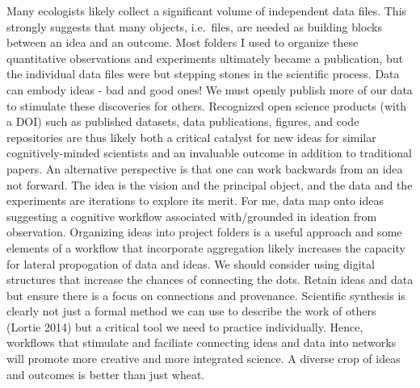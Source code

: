 \documentclass[]{elsarticle} %
\begin{document}
Many ecologists likely collect a significant volume of independent data
files. This strongly suggests that many objects, i.e.~files, are needed
as building blocks between an idea and an outcome. Most folders I used
to organize these quantitative observations and experiments ultimately
became a publication, but the individual data files were but stepping
stones in the scientific process. Data can embody ideas - bad and good
ones! We must openly publish more of our data to stimulate these
discoveries for others. Recognized open science products (with a DOI)
such as published datasets, data publications, figures, and code
repositories are thus likely both a critical catalyst for new ideas for
similar cognitively-minded scientists and an invaluable outcome in
addition to traditional papers. An alternative perspective is that one
can work backwards from an idea not forward. The idea is the vision and
the principal object, and the data and the experiments are iterations to
explore its merit. For me, data map onto ideas suggesting a cognitive
workflow associated with/grounded in ideation from observation.
Organizing ideas into project folders is a useful approach and some
elements of a workflow that incorporate aggregation likely increases the
capacity for lateral propogation of data and ideas. We should consider
using digital structures that increase the chances of connecting the
dots. Retain ideas and data but ensure there is a focus on connections
and provenance. Scientific synthesis is clearly not just a formal method
we can use to describe the work of others (Lortie 2014) but a critical
tool we need to practice individually. Hence, workflows that stimulate
and faciliate connecting ideas and data into networks will promote more
creative and more integrated science. A diverse crop of ideas and
outcomes is better than just wheat.
\end{document}
